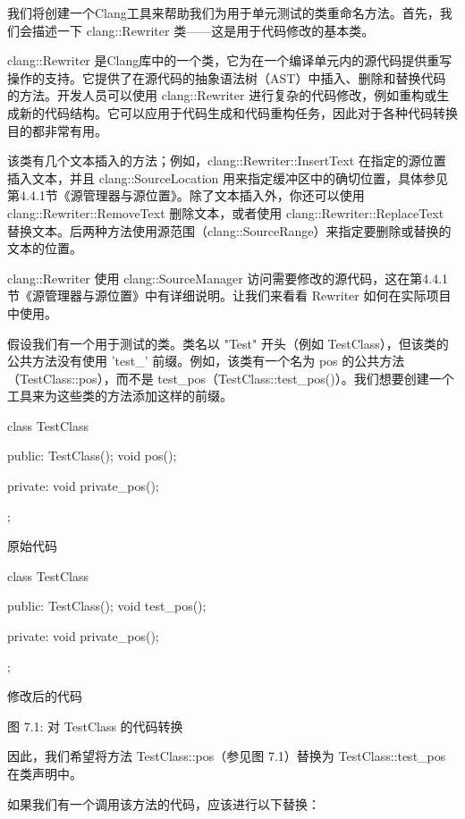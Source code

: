 我们将创建一个Clang工具来帮助我们为用于单元测试的类重命名方法。首先，我们会描述一下 clang::Rewriter 类——这是用于代码修改的基本类。



clang::Rewriter 是Clang库中的一个类，它为在一个编译单元内的源代码提供重写操作的支持。它提供了在源代码的抽象语法树（AST）中插入、删除和替换代码的方法。开发人员可以使用 clang::Rewriter 进行复杂的代码修改，例如重构或生成新的代码结构。它可以应用于代码生成和代码重构任务，因此对于各种代码转换目的都非常有用。

该类有几个文本插入的方法；例如，clang::Rewriter::InsertText 在指定的源位置插入文本，并且 clang::SourceLocation 用来指定缓冲区中的确切位置，具体参见第4.4.1节《源管理器与源位置》。除了文本插入外，你还可以使用 clang::Rewriter::RemoveText 删除文本，或者使用 clang::Rewriter::ReplaceText 替换文本。后两种方法使用源范围（clang::SourceRange）来指定要删除或替换的文本的位置。

clang::Rewriter 使用 clang::SourceManager 访问需要修改的源代码，这在第4.4.1节《源管理器与源位置》中有详细说明。让我们来看看 Rewriter 如何在实际项目中使用。


假设我们有一个用于测试的类。类名以 "Test" 开头（例如 TestClass），但该类的公共方法没有使用 'test\_' 前缀。例如，该类有一个名为 pos 的公共方法（TestClass::pos），而不是 test\_pos（TestClass::test\_pos()）。我们想要创建一个工具来为这些类的方法添加这样的前缀。

\begin{cpp}
class TestClass {
public:
  TestClass(){};
  void pos(){};

private:
  void private_pos(){};
};
\end{cpp}

原始代码

\begin{cpp}
class TestClass {
public:
  TestClass(){};
  void test_pos(){};

private:
  void private_pos(){};
};
\end{cpp}

修改后的代码

\begin{center}
图 7.1: 对 TestClass 的代码转换
\end{center}


因此，我们希望将方法 TestClass::pos（参见图 7.1）替换为 TestClass::test\_pos 在类声明中。

如果我们有一个调用该方法的代码，应该进行以下替换：

